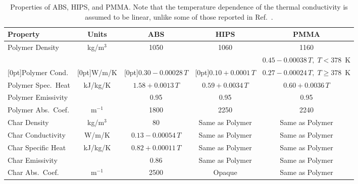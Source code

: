 \begin{table}[h!]
\caption[Properties of ABS, HIPS, and PMMA]{Properties of ABS, HIPS, and PMMA. Note that the temperature dependence of the thermal conductivity is assumed to be linear, unlike some of those reported in Ref.~\cite{Li:Thesis}.}
\centering
\begin{tabular*}{\textwidth}{|l|@{\extracolsep\fill}c@{\extracolsep\fill}|c|c|c|}
\hline
Property                    & Units         & ABS                     & HIPS                    & PMMA                     \\ \hline \hline
Polymer Density             & kg/m$^3$      & 1050                    & 1060                    & 1160                     \\ \hline
                            &               &                         &                         & $0.45-0.00038 \, T, \; T<378$~K      \\
\raisebox{1.5ex}[0pt]{Polymer Cond.}        & \raisebox{1.5ex}[0pt]{W/m/K}         & \raisebox{1.5ex}[0pt]{$0.30-0.00028 \, T$}  & \raisebox{1.5ex}[0pt]{$0.10+0.0001  \, T$} & $0.27-0.00024 \, T, \; T\ge 378$~K  \\ \hline
Polymer Spec.~Heat          & kJ/kg/K       & $1.58+0.0013  \, T$     & $0.59+0.0034  \, T$     & $0.60+0.0036  \, T$      \\ \hline
Polymer Emissivity          &               & 0.95                    & 0.95                    & 0.95                     \\ \hline
Polymer Abs.~Coef.          & m$^{-1}$      & 1800                    & 2250                    & 2240                     \\ \hline
Char Density                & kg/m$^3$      & 80                      & Same as Polymer         & Same as Polymer          \\ \hline
Char Conductivity           & W/m/K         & $0.13-0.00054 \, T$     & Same as Polymer         & Same as Polymer          \\ \hline
Char Specific Heat          & kJ/kg/K       & $0.82+0.00011 \, T$     & Same as Polymer         & Same as Polymer          \\ \hline
Char Emissivity             &               & 0.86                    & Same as Polymer         & Same as Polymer          \\ \hline
Char Abs.~Coef.             & m$^{-1}$      & 2500                    & Opaque                  & Same as Polymer          \\ \hline

\end{tabular*}
\end{table}
